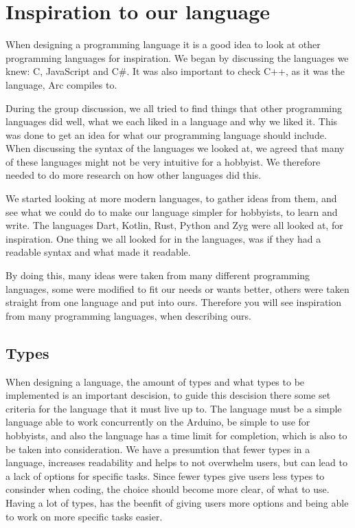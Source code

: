 \section{Inspiration to our language}\label{sec:inspiration}
When designing a programming language it is a good idea to look at other programming languages for inspiration. We began by discussing the languages we knew: C, JavaScript and C\#. It was also important to check C++, as it was the language, Arc compiles to.

During the group discussion,
we all tried to find things that other programming languages did well, what we each liked in a language and why we liked it. This was done to get an idea for what our programming language should include.
When discussing the syntax of the languages we looked at, we agreed that many of these languages might not be very intuitive for a hobbyist. We therefore needed to do more research on how other languages did this.

We started looking at more modern languages, to gather ideas from them, and see what we could do to make our language simpler for hobbyists, to learn and write. The languages Dart, Kotlin, Rust, Python and Zyg were all looked at, for inspiration. One thing we all looked for in the languages, was if they had a readable syntax and what made it readable.

By doing this, many ideas were taken from many different programming languages, some were modified to fit our needs or wants better, others were taken straight from one language and put into ours. Therefore you will see inspiration from many programming languages, when describing ours.



\subsection{Types}\label{sec:types}
When designing a language, the amount of types and what types to be implemented is an important descision, to guide this descision there some set criteria for the language that it must live up to. The language must be a simple language able to work concurrently on the Arduino, be simple to use for hobbyists, and also the language has a time limit for completion, which is also to be taken into consideration. We have a presumtion that fewer types in a language, increases readability and helps to not overwhelm users, but can lead to a lack of options for specific tasks. Since fewer types give users less types to consinder when coding, the choice should become more clear, of what to use. Having a lot of types, has the beenfit of giving users more options and being able to work on more specific tasks easier.

